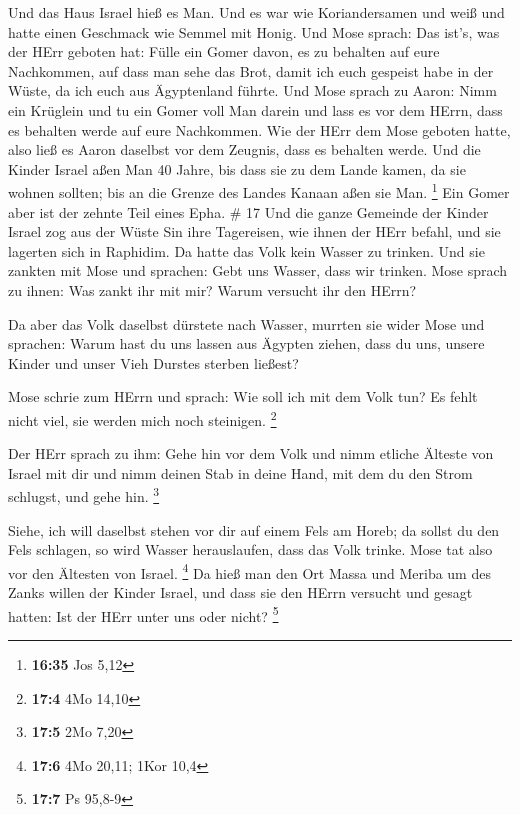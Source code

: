  Und das Haus Israel hieß es Man. Und es war wie
Koriandersamen und weiß und hatte einen Geschmack wie Semmel mit Honig.
 Und Mose sprach: Das ist's, was der HErr geboten hat:
Fülle ein Gomer davon, es zu behalten auf eure Nachkommen, auf dass man
sehe das Brot, damit ich euch gespeist habe in der Wüste, da ich euch
aus Ägyptenland führte.  Und Mose sprach zu Aaron: Nimm ein
Krüglein und tu ein Gomer voll Man darein und lass es vor dem HErrn,
dass es behalten werde auf eure Nachkommen.  Wie der HErr
dem Mose geboten hatte, also ließ es Aaron daselbst vor dem Zeugnis,
dass es behalten werde.  Und die Kinder Israel aßen Man 40
Jahre, bis dass sie zu dem Lande kamen, da sie wohnen sollten; bis an
die Grenze des Landes Kanaan aßen sie Man. \footnote{\textbf{16:35} Jos
  5,12}  Ein Gomer aber ist der zehnte Teil eines Epha. \#
17  Und die ganze Gemeinde der Kinder Israel zog aus der
Wüste Sin ihre Tagereisen, wie ihnen der HErr befahl, und sie lagerten
sich in Raphidim. Da hatte das Volk kein Wasser zu trinken. 
Und sie zankten mit Mose und sprachen: Gebt uns Wasser, dass wir
trinken. Mose sprach zu ihnen: Was zankt ihr mit mir? Warum versucht ihr
den HErrn?

 Da aber das Volk daselbst dürstete nach Wasser, murrten sie
wider Mose und sprachen: Warum hast du uns lassen aus Ägypten ziehen,
dass du uns, unsere Kinder und unser Vieh Durstes sterben ließest?

 Mose schrie zum HErrn und sprach: Wie soll ich mit dem Volk
tun? Es fehlt nicht viel, sie werden mich noch steinigen. \footnote{\textbf{17:4}
  4Mo 14,10}

 Der HErr sprach zu ihm: Gehe hin vor dem Volk und nimm
etliche Älteste von Israel mit dir und nimm deinen Stab in deine Hand,
mit dem du den Strom schlugst, und gehe hin. \footnote{\textbf{17:5} 2Mo
  7,20}

 Siehe, ich will daselbst stehen vor dir auf einem Fels am
Horeb; da sollst du den Fels schlagen, so wird Wasser herauslaufen, dass
das Volk trinke. Mose tat also vor den Ältesten von Israel. \footnote{\textbf{17:6}
  4Mo 20,11; 1Kor 10,4}  Da hieß man den Ort Massa und
Meriba um des Zanks willen der Kinder Israel, und dass sie den HErrn
versucht und gesagt hatten: Ist der HErr unter uns oder nicht?
\footnote{\textbf{17:7} Ps 95,8-9}

